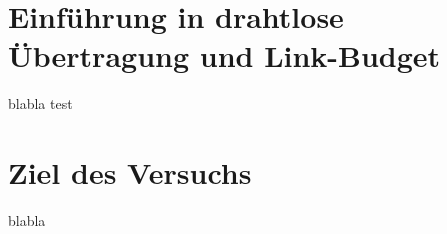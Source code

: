     \section{Einführung in drahtlose Übertragung und Link-Budget}
    blabla test
    \section{Ziel des Versuchs}
    blabla
\clearpage
